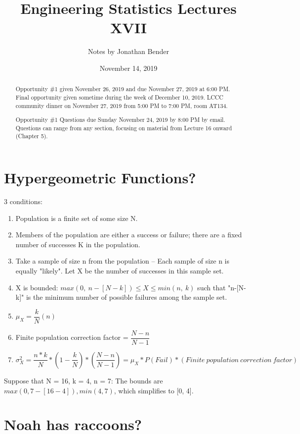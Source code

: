 \documentclass[]{article}
\title{Engineering Statistics Lectures XVII}
\author{Notes by Jonathan Bender}
\date{November 14, 2019}
\begin{document}
	
	\maketitle
	
	\begin{abstract}
		Opportunity \#1 given November 26, 2019 and due November 27, 2019 at 6:00 PM.
		Final opportunity given sometime during the week of December 10, 2019.
		LCCC community dinner on November 27, 2019 from 5:00 PM to 7:00 PM, room AT134.
		
		Opportunity \#1 Questions due Sunday November 24, 2019 by 8:00 PM by email. Questions can range from any section, focusing on material from Lecture 16 onward (Chapter 5).
	\end{abstract}

	\section{Hypergeometric Functions?}
	
		3 conditions:
		\begin{enumerate}
			\item Population is a finite set of some size N.
			\item Members of the population are either a success or failure; there are a fixed number of successes K in the population.
			\item Take a sample of size n from the population -- Each sample of size n is equally "likely". Let X be the number of successes in this sample set.
			\item X is bounded: $max(0,\ n-[N-k]) \leq X \leq min(n,\ k)$ such that "n-[N-k]" is the minimum number of possible failures among the sample set.
			\item $\mu_X = \dfrac{k}{N}(n)$
			\item Finite population correction factor = $\dfrac{N-n}{N-1}$
			\item $\sigma_X^2 = \dfrac{n * k}{N} * (1-\dfrac{k}{N}) * (\dfrac{N-n}{N-1}) = \mu_X * P(Fail) * (Finite\ population\ correction\ factor)$
		\end{enumerate}
	
		Suppose that N = 16, k = 4, n = 7: The bounds are $max(0,7-[16-4]),min(4,7)$, which simplifies to [0, 4].
		
	
	\pagebreak
	\section{Noah has raccoons?}
		
\end{document}

